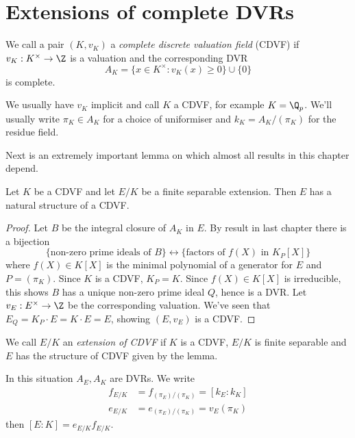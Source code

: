 \documentclass[a4paper]{article}
\begin{document}
\section{Extensions of complete DVRs}

\begin{definition}
  We call a pair \((K, v_K)\) a \emph{complete discrete valuation field} (CDVF) if \(v_K: K^\times \to \Z\) is a valuation and the corresponding DVR
  \[
    A_K = \{x \in K^\times: v_K(x) \geq 0\} \cup \{0\}
  \]
  is complete.
\end{definition}

We usually have \(v_K\) implicit and call \(K\) a CDVF, for example \(K = \Q_p\). We'll usually write \(\pi_K \in A_K\) for a choice of uniformiser and \(k_K = A_K/(\pi_K)\) for the residue field.

Next is an extremely important lemma on which almost all results in this chapter depend.

\begin{lemma}
  Let \(K\) be a CDVF and let \(E/K\) be a finite separable extension. Then \(E\) has a natural structure of a CDVF.
\end{lemma}

\begin{proof}
  Let \(B\) be the integral closure of \(A_K\) in \(E\). By result in last chapter there is a bijection
  \[
    \{\text{non-zero prime ideals of \(B\)}\} \longleftrightarrow \{\text{factors of \(f(X)\) in \(K_P[X]\)}\}
  \]
  where \(f(X) \in K[X]\) is the minimal polynomial of a generator for \(E\) and \(P = (\pi_K)\). Since \(K\) is a CDVF, \(K_P = K\). Since \(f(X) \in K[X]\) is irreducible, this shows \(B\) has a unique non-zero prime ideal \(Q\), hence is a DVR. Let \(v_E: E^\times \to \Z\) be the corresponding valuation. We've seen that \(E_Q = K_P \cdot E = K \cdot E = E\), showing \((E, v_E)\) is a CDVF.
\end{proof}

\begin{definition}
  We call \(E/K\) an \emph{extension of CDVF} if \(K\) is a CDVF, \(E/K\) is finite separable and \(E\) has the structure of CDVF given by the lemma.
\end{definition}

In this situation \(A_E, A_K\) are DVRs. We write
\begin{align*}
  f_{E/K} &= f_{(\pi_E)/(\pi_K)} = [k_E: k_K] \\
  e_{E/K} &= e_{(\pi_E)/(\pi_K)} = v_E(\pi_K)
\end{align*}
then \([E: K] = e_{E/K} f_{E/K}\).
\end{document}
